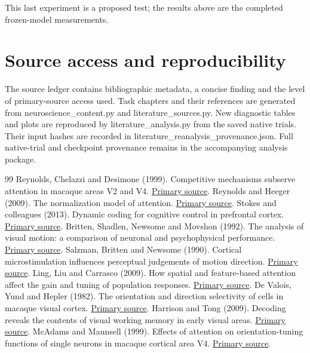 \documentclass[11pt]{article}
\begin{document}
This last experiment is a proposed test; the results above are the completed frozen-model measurements.
\clearpage\section{Source access and reproducibility}
The source ledger contains bibliographic metadata, a concise finding and the level of primary-source access used. Task chapters and their references are generated from neuroscience\_content.py and literature\_sources.py. New diagnostic tables and plots are reproduced by literature\_analysis.py from the saved native trials. Their input hashes are recorded in literature\_reanalysis\_provenance.json. Full native-trial and checkpoint provenance remains in the accompanying analysis package.
\begin{thebibliography}{99}
 Reynolds, Chelazzi and Desimone (1999). Competitive mechanisms subserve attention in macaque areas V2 and V4. \href{https://pubmed.ncbi.nlm.nih.gov/10024360/}{Primary source}.
 Reynolds and Heeger (2009). The normalization model of attention. \href{https://pmc.ncbi.nlm.nih.gov/articles/PMC2752446/}{Primary source}.
 Stokes and colleagues (2013). Dynamic coding for cognitive control in prefrontal cortex. \href{https://pmc.ncbi.nlm.nih.gov/articles/PMC3898895/}{Primary source}.
 Britten, Shadlen, Newsome and Movshon (1992). The analysis of visual motion: a comparison of neuronal and psychophysical performance. \href{https://pubmed.ncbi.nlm.nih.gov/1464765/}{Primary source}.
 Salzman, Britten and Newsome (1990). Cortical microstimulation influences perceptual judgements of motion direction. \href{https://pubmed.ncbi.nlm.nih.gov/2366872/}{Primary source}.
 Ling, Liu and Carrasco (2009). How spatial and feature-based attention affect the gain and tuning of population responses. \href{https://pmc.ncbi.nlm.nih.gov/articles/PMC2696585/}{Primary source}.
 De Valois, Yund and Hepler (1982). The orientation and direction selectivity of cells in macaque visual cortex. \href{https://pubmed.ncbi.nlm.nih.gov/7112953/}{Primary source}.
 Harrison and Tong (2009). Decoding reveals the contents of visual working memory in early visual areas. \href{https://pubmed.ncbi.nlm.nih.gov/19225460/}{Primary source}.
 McAdams and Maunsell (1999). Effects of attention on orientation-tuning functions of single neurons in macaque cortical area V4. \href{https://pubmed.ncbi.nlm.nih.gov/9870971/}{Primary source}.

\end{thebibliography}
\end{document}
